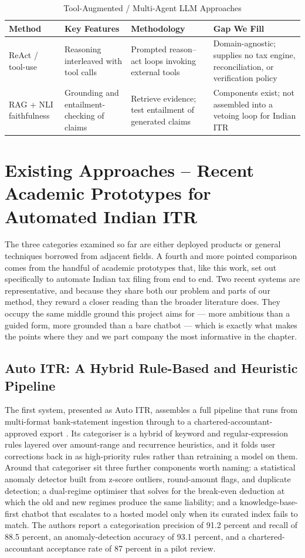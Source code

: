 \begin{table}[H]
\centering
\caption{Tool-Augmented / Multi-Agent LLM Approaches}
\label{tab:cat-c-comparison}
\small
\begin{tabularx}{\textwidth}{|l|X|X|X|}
\hline
\textbf{Method} & \textbf{Key Features} & \textbf{Methodology} & \textbf{Gap We Fill} \\
\hline
ReAct / tool-use \cite{ref7} & Reasoning interleaved with tool calls & Prompted reason--act loops invoking external tools & Domain-agnostic; supplies no tax engine, reconciliation, or verification policy \\
\hline
RAG + NLI faithfulness \cite{ref8}\cite{ref9} & Grounding and entailment-checking of claims & Retrieve evidence; test entailment of generated claims & Components exist; not assembled into a vetoing loop for Indian ITR \\
\hline
\end{tabularx}
\end{table}

\section{Existing Approaches -- Recent Academic Prototypes for Automated Indian ITR}
\label{sec:category-d}

The three categories examined so far are either deployed products or general
techniques borrowed from adjacent fields. A fourth and more pointed comparison
comes from the handful of academic prototypes that, like this work, set out
specifically to automate Indian tax filing from end to end. Two recent systems
are representative, and because they share both our problem and parts of our
method, they reward a closer reading than the broader literature does. They
occupy the same middle ground this project aims for --- more ambitious than a
guided form, more grounded than a bare chatbot --- which is exactly what makes
the points where they and we part company the most informative in the chapter.

\subsection{Auto ITR: A Hybrid Rule-Based and Heuristic Pipeline}
The first system, presented as Auto ITR, assembles a full pipeline that runs from
multi-format bank-statement ingestion through to a chartered-accountant-approved
export \cite{ref13}. Its categoriser is a hybrid of keyword and regular-expression
rules layered over amount-range and recurrence heuristics, and it folds user
corrections back in as high-priority rules rather than retraining a model on them.
Around that categoriser sit three further components worth naming: a statistical
anomaly detector built from z-score outliers, round-amount flags, and duplicate
detection; a dual-regime optimiser that solves for the break-even deduction at
which the old and new regimes produce the same liability; and a
knowledge-base-first chatbot that escalates to a hosted model only when its
curated index fails to match. The authors report a categorisation precision of
91.2 percent and recall of 88.5 percent, an anomaly-detection accuracy of 93.1
percent, and a chartered-accountant acceptance rate of 87 percent in a pilot
review.

